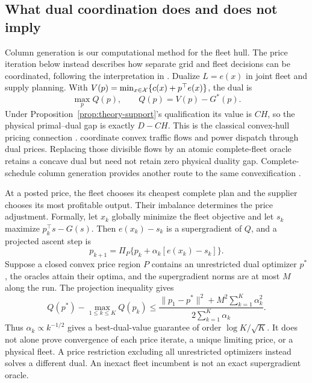 \subsection{What dual coordination does and does not imply}
Column generation is our computational method for the fleet hull. The price
iteration below instead describes how separate grid and fleet decisions can
be coordinated, following the interpretation in \citet{alizadeh2016coupled}.
Dualize $L=e(x)$ in joint fleet and supply planning. With
$V(p)=\min_{x\in\mathcal X}\{c(x)+p^\top e(x)\}$, the dual is
\begin{equation}\label{eq:dispatch-dual}
 \max_p Q(p),\qquad Q(p)=V(p)-G^*(p).
\end{equation}
Under Proposition~\ref{prop:theory-support}'s qualification its value is
$CH$, so the physical primal--dual gap is exactly $D-CH$. This is the
classical convex-hull pricing connection \citep{gribikHoganPope2007}.
\citet{alizadeh2016coupled} coordinate convex traffic flows and power
dispatch through dual prices. Replacing those divisible flows by an atomic
complete-fleet oracle retains a concave dual but need not retain zero
physical duality gap. Complete-schedule column generation provides another
route to the same convexification \citep{andrianesis2022hull}.

At a posted price, the fleet chooses its cheapest complete plan and the
supplier chooses its most profitable output. Their imbalance determines the
price adjustment. Formally, let $x_k$ globally minimize the fleet objective and let $s_k$
maximize $p_k^\top s-G(s)$. Then $e(x_k)-s_k$ is a supergradient of $Q$,
and a projected ascent step is
\begin{equation}\label{eq:dispatch-update}
 p_{k+1}=\Pi_P\{p_k+\alpha_k[e(x_k)-s_k]\}.
\end{equation}
Suppose a closed convex price region $P$ contains an unrestricted dual
optimizer $p^*$, the oracles attain their optima, and the supergradient norms
are at most $M$ along the run. The projection inequality gives
\begin{equation}\label{eq:dispatch-rate}
 Q(p^*)-\max_{1\le k\le K}Q(p_k)
 \le\frac{\|p_1-p^*\|^2+M^2\sum_{k=1}^K\alpha_k^2}
 {2\sum_{k=1}^K\alpha_k}.
\end{equation}
Thus $\alpha_k\propto k^{-1/2}$ gives a best-dual-value guarantee of order
$\log K/\sqrt K$. It does not alone prove convergence of each price
iterate, a unique limiting price, or a physical fleet. A price restriction
excluding all unrestricted optimizers instead solves a different dual.
An inexact fleet incumbent is not an exact supergradient oracle.

